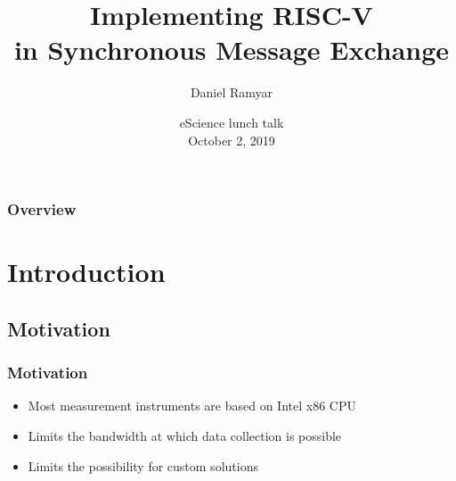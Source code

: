 \documentclass{beamer}
\title{Implementing RISC-V\\ in Synchronous Message Exchange}
\author{Daniel Ramyar}
\institute{Niels Bohr Institute \\ University of Copenhagen}
\date{eScience lunch talk \\ October 2, 2019}
\begin{document}
	\begin{frame}
		\titlepage
		\vspace{-0.5cm}	
	\end{frame}

	\begin{frame}
		\frametitle{Overview}

		\small{\tableofcontents}%
	\end{frame}
	
	\section{Introduction}

	\begin{frame}
		\subsection{Motivation}
		\frametitle{Motivation}
        \begin{itemize}
            \item Most measurement instruments are based on Intel x86 CPU
            \item Limits the bandwidth at which data collection is possible
            \item Limits the possibility for custom solutions 
        \end{itemize}

	\end{frame}
\end{document}
